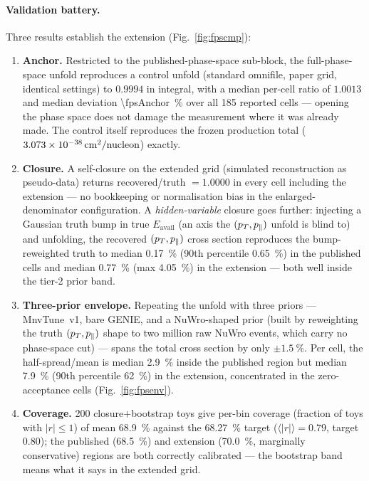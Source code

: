 \paragraph{Validation battery.}
Three results establish the extension (Fig.~\ref{fig:fpscmp}):
\begin{enumerate}[itemsep=2pt]
  \item \textbf{Anchor.} Restricted to the published-phase-space sub-block,
        the full-phase-space unfold reproduces a control unfold (standard
        omnifile, paper grid, identical settings) to $0.9994$ in integral,
        with a median per-cell ratio of $1.0013$ and median deviation
        \SI{\fpsAnchor}{\percent} over all 185 reported cells --- opening the
        phase space does not damage the measurement where it was already
        made. The control itself reproduces the frozen production total
        ($\SI{3.073e-38}{cm^2/nucleon}$) exactly.
  \item \textbf{Closure.} A self-closure on the extended grid (simulated
        reconstruction as pseudo-data) returns recovered/truth $=1.0000$ in
        every cell including the extension --- no bookkeeping or
        normalisation bias in the enlarged-denominator configuration. A
        \emph{hidden-variable} closure goes further: injecting a Gaussian
        truth bump in true $E_{\mathrm{avail}}$ (an axis the
        $(p_{T},p_{\parallel})$ unfold is blind to) and unfolding, the recovered
        $(p_{T},p_{\parallel})$ cross section reproduces the bump-reweighted truth to
        median \SI{0.17}{\percent} (90th percentile \SI{0.65}{\percent}) in
        the published cells and median \SI{0.77}{\percent} (max
        \SI{4.05}{\percent}) in the extension --- both well inside the
        tier-2 prior band.
  \item \textbf{Three-prior envelope.} Repeating the unfold with three
        priors --- MnvTune~v1, bare GENIE, and a NuWro-shaped prior (built
        by reweighting the truth $(p_{T},p_{\parallel})$ shape to two million raw
        NuWro events, which carry no phase-space cut) --- spans the total
        cross section by only $\pm\SI{1.5}{\percent}$. Per cell, the
        half-spread/mean is median \SI{2.9}{\percent} inside the published
        region but median \SI{7.9}{\percent} (90th percentile
        \SI{62}{\percent}) in the extension, concentrated in the
        zero-acceptance cells (Fig.~\ref{fig:fpsenv}).
  \item \textbf{Coverage.} 200 closure$+$bootstrap toys give per-bin
        coverage (fraction of toys with $|r|\le1$) of mean
        \SI{68.9}{\percent} against the \SI{68.27}{\percent} target
        ($\langle|r|\rangle=0.79$, target $0.80$); the published
        (\SI{68.5}{\percent}) and extension (\SI{70.0}{\percent}, marginally
        conservative) regions are both correctly calibrated --- the bootstrap
        band means what it says in the extended grid.
\end{enumerate}

